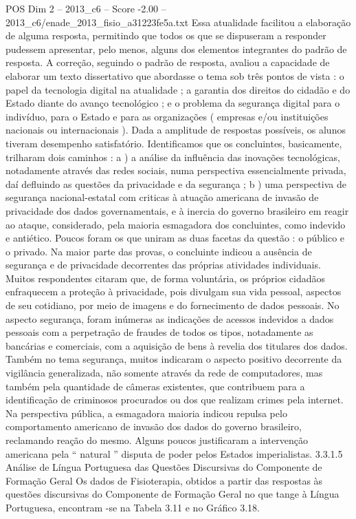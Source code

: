 \begin{textsample}{POS Dim 2 – 2013\_c6 – Score -2.00 – 2013\_c6/enade\_2013\_fisio\_a31223fe5a.txt}
Essa atualidade facilitou a elaboração de alguma resposta, permitindo que todos os que se dispuseram a responder pudessem apresentar, pelo menos, alguns dos elementos integrantes do padrão de resposta.
A correção, seguindo o padrão de resposta, avaliou a capacidade de elaborar um texto dissertativo que abordasse o tema sob três pontos de vista : o papel da tecnologia digital na atualidade ; a garantia dos direitos do cidadão e do Estado diante do avanço tecnológico ; e o problema da segurança digital para o indivíduo, para o Estado e para as organizações ( empresas e/ou instituições nacionais ou internacionais ).
Dada a amplitude de respostas possíveis, os alunos tiveram desempenho satisfatório.
Identificamos que os concluintes, basicamente, trilharam dois caminhos : a ) a análise da influência das inovações tecnológicas, notadamente através das redes sociais, numa perspectiva essencialmente privada, daí defluindo as questões da privacidade e da segurança ; b ) uma perspectiva de segurança nacional-estatal com criticas à atuação americana de invasão de privacidade dos dados governamentais, e à inercia do governo brasileiro em reagir ao ataque, considerado, pela maioria esmagadora dos concluintes, como indevido e antiético.
Poucos foram os que uniram as duas facetas da questão : o público e o privado.
Na maior parte das provas, o concluinte indicou a ausência de segurança e de privacidade decorrentes das próprias atividades individuais.
Muitos respondentes citaram que, de forma voluntária, os próprios cidadãos enfraquecem a proteção à privacidade, pois divulgam sua vida pessoal, aspectos de seu cotidiano, por meio de imagens e do fornecimento de dados pessoais.
No aspecto segurança, foram inúmeras as indicações de acessos indevidos a dados pessoais com a perpetração de fraudes de todos os tipos, notadamente as bancárias e comerciais, com a aquisição de bens à revelia dos titulares dos dados.
Também no tema segurança, muitos indicaram o aspecto positivo decorrente da vigilância generalizada, não somente através da rede de computadores, mas também pela quantidade de câmeras existentes, que contribuem para a identificação de criminosos procurados ou dos que realizam crimes pela internet.
Na perspectiva pública, a esmagadora maioria indicou repulsa pelo comportamento americano de invasão dos dados do governo brasileiro, reclamando reação do mesmo.
Alguns poucos justificaram a intervenção americana pela “ natural ” disputa de poder pelos Estados imperialistas. 3.3.1.5 Análise de Língua Portuguesa das Questões Discursivas do Componente de Formação Geral Os dados de Fisioterapia, obtidos a partir das respostas às questões discursivas do Componente de Formação Geral no que tange à Língua Portuguesa, encontram -se na Tabela 3.11 e no Gráfico 3.18.

\end{textsample}
